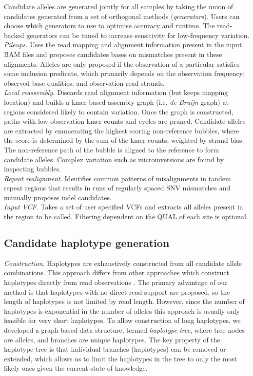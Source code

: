 \documentclass[notitlepage, twocolumn]{article}
\begin{document}
Candidate alleles are generated jointly for all samples by taking the union of candidates generated from a set of orthogonal methods (\emph{generators}). Users can choose which generators to use to optimise accuracy and runtime. The read-backed generators can be tuned to increase sensitivity for low-frequency variation.\\

\emph{Pileups.} Uses the read mapping and alignment information present in the input BAM files and proposes candidates bases on mismatches present in these alignments. Alleles are only proposed if the observation of a particular satisfies some inclusion predicate, which primarily depends on the observation frequency; observed base qualities; and observation read strands.\\

\emph{Local reassembly.} Discards read alignment information (but keeps mapping location) and builds a kmer based assembly graph (i.e. \emph{de Bruijn} graph) at regions considered likely to contain variation. Once the graph is constructed, paths with low observation kmer counts and cycles are pruned. Candidate alleles are extracted by enumerating the highest scoring non-reference bubbles, where the score is determined by the sum of the kmer counts, weighted by strand bias. The non-reference path of the bubble is aligned to the reference to form candidate alleles. Complex variation such as microinversions are found by inspecting bubbles.\\

\emph{Repeat realignment.} Identifies common patterns of misalignments in tandem repeat regions that results in runs of regularly spaced SNV mismatches and manually proposes indel candidates.\\

\emph{Input VCF.} Takes a set of user specified VCFs and extracts all alleles present in the region to be called. Filtering dependent on the QUAL of each site is optional.

\subsection*{Candidate haplotype generation}

\emph{Construction.} Haplotypes are exhaustively constructed from all candidate allele combinations. This approach differs from other approaches which construct haplotypes directly from read observations \cite{RN141, RN538}. The primary advantage of our method is that haplotypes with no direct read support are proposed, so the length of haplotypes is not limited by read length. However, since the number of haplotypes is exponential in the number of alleles this approach is usually only feasible for very short haplotypes. To allow construction of long haplotypes, we developed a graph-based data structure, termed \emph{haplotype-tree}, where tree-nodes are alleles, and branches are unique haplotypes. The key property of the haplotype-tree is that individual branches (haplotypes) can be removed or extended, which allows us to limit the haplotypes in the tree to only the most likely ones given the current state of knowledge.\\
\end{document}
